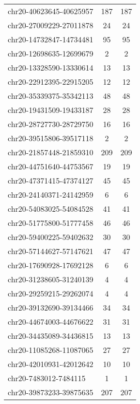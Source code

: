 \begin{longtable}{lSS}
	chr20-40623645-40625957 & 187    & 187                         \\
	chr20-27009229-27011878 & 24     & 24                          \\
	chr20-14732847-14734481 & 95     & 95                          \\
	chr20-12698635-12699679 & 2      & 2                           \\
	chr20-13328590-13330614 & 13     & 13                          \\
	chr20-22912395-22915205 & 12     & 12                          \\
	chr20-35339375-35342113 & 48     & 48                          \\
	chr20-19431509-19433187 & 28     & 28                          \\
	chr20-28727730-28729750 & 16     & 16                          \\
	chr20-39515806-39517118 & 2      & 2                           \\
	chr20-21857448-21859310 & 209    & 209                         \\
	chr20-44751640-44753567 & 19     & 19                          \\
	chr20-47371415-47374127 & 45     & 45                          \\
	chr20-24140371-24142959 & 6      & 6                           \\
	chr20-54083025-54084528 & 41     & 41                          \\
	chr20-51775800-51777458 & 46     & 46                          \\
	chr20-59400225-59402632 & 30     & 30                          \\
	chr20-57144627-57147621 & 47     & 47                          \\
	chr20-17690928-17692128 & 6      & 6                           \\
	chr20-31238605-31240139 & 4      & 4                           \\
	chr20-29259215-29262074 & 4      & 4                           \\
	chr20-39132690-39134466 & 34     & 34                          \\
	chr20-44674003-44676622 & 31     & 31                          \\
	chr20-34435089-34436815 & 13     & 13                          \\
	chr20-11085268-11087065 & 27     & 27                          \\
	chr20-42010931-42012642 & 10     & 10                          \\
	chr20-7483012-7484115   & 1      & 1                           \\
	chr20-39873233-39875635 & 207    & 207                         \\
\end{longtable}

